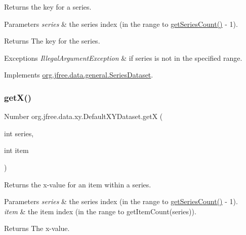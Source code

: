 Returns the key for a series.


\begin{DoxyParams}{Parameters}
{\em series} & the series index (in the range {} to {\ttfamily \mbox{\hyperlink{classorg_1_1jfree_1_1data_1_1xy_1_1_default_x_y_dataset_a0e11a4936eb729adf611cb44013abc5b}{get\+Series\+Count()}} -\/ 1}).\\
\hline
\end{DoxyParams}
\begin{DoxyReturn}{Returns}
The key for the series.
\end{DoxyReturn}

\begin{DoxyExceptions}{Exceptions}
{\em Illegal\+Argument\+Exception} & if {\ttfamily series} is not in the specified range. \\
\hline
\end{DoxyExceptions}


Implements \mbox{\hyperlink{interfaceorg_1_1jfree_1_1data_1_1general_1_1_series_dataset_a60488892b2314a05a012999e26a74178}{org.\+jfree.\+data.\+general.\+Series\+Dataset}}.

\mbox{\label{classorg_1_1jfree_1_1data_1_1xy_1_1_default_x_y_dataset_ab501c39779d3289533248c8c40a18c1d}} 
\subsubsection{\texorpdfstring{get\+X()}{getX()}}
{\footnotesize\ttfamily Number org.\+jfree.\+data.\+xy.\+Default\+X\+Y\+Dataset.\+getX (\begin{DoxyParamCaption}\item[{int}]{series,  }\item[{int}]{item }\end{DoxyParamCaption})}

Returns the x-\/value for an item within a series.


\begin{DoxyParams}{Parameters}
{\em series} & the series index (in the range {} to {\ttfamily \mbox{\hyperlink{classorg_1_1jfree_1_1data_1_1xy_1_1_default_x_y_dataset_a0e11a4936eb729adf611cb44013abc5b}{get\+Series\+Count()}} -\/ 1}). \\
\hline
{\em item} & the item index (in the range {} to {\ttfamily get\+Item\+Count(series)}).\\
\hline
\end{DoxyParams}
\begin{DoxyReturn}{Returns}
The x-\/value.
\end{DoxyReturn}

